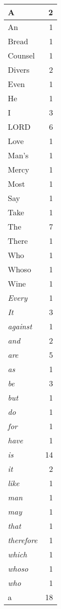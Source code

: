 \begin{center}
\begin{longtable}{l|r}
A & 2\\ \hline 
An & 1\\ \hline 
Bread & 1\\ \hline 
Counsel & 1\\ \hline 
Divers & 2\\ \hline 
Even & 1\\ \hline 
He & 1\\ \hline 
I & 3\\ \hline 
LORD & 6\\ \hline 
Love & 1\\ \hline 
Man's & 1\\ \hline 
Mercy & 1\\ \hline 
Most & 1\\ \hline 
Say & 1\\ \hline 
Take & 1\\ \hline 
The & 7\\ \hline 
There & 1\\ \hline 
Who & 1\\ \hline 
Whoso & 1\\ \hline 
Wine & 1\\ \hline 
\emph{Every} & 1\\ \hline 
\emph{It} & 3\\ \hline 
\emph{against} & 1\\ \hline 
\emph{and} & 2\\ \hline 
\emph{are} & 5\\ \hline 
\emph{as} & 1\\ \hline 
\emph{be} & 3\\ \hline 
\emph{but} & 1\\ \hline 
\emph{do} & 1\\ \hline 
\emph{for} & 1\\ \hline 
\emph{have} & 1\\ \hline 
\emph{is} & 14\\ \hline 
\emph{it} & 2\\ \hline 
\emph{like} & 1\\ \hline 
\emph{man} & 1\\ \hline 
\emph{may} & 1\\ \hline 
\emph{that} & 1\\ \hline 
\emph{therefore} & 1\\ \hline 
\emph{which} & 1\\ \hline 
\emph{whoso} & 1\\ \hline 
\emph{who} & 1\\ \hline 
a & 18\\ \hline 

\end{longtable}
\end{center}
